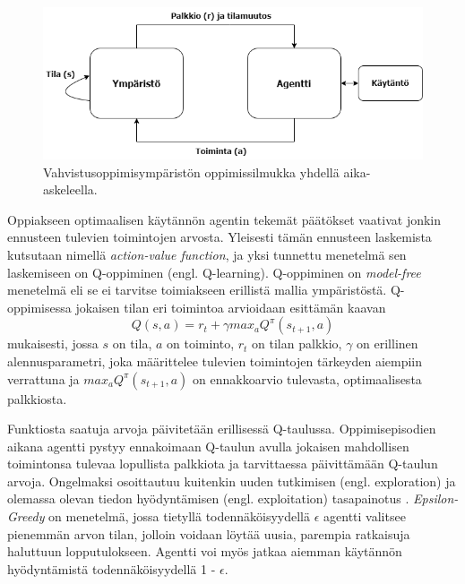 \documentclass[utf8]{gradu3}
\begin{document}
\begin{figure}[h]
\centering
\includegraphics[width=12cm]{reinflearning.png}
\caption{Vahvistusoppimisympäristön oppimissilmukka yhdellä aika-askeleella.}
\label{reinflearning}
\end{figure}

Oppiakseen optimaalisen käytännön agentin tekemät päätökset vaativat jonkin ennusteen tulevien toimintojen arvosta. Yleisesti tämän ennusteen laskemista kutsutaan nimellä \textit{action-value function}, ja yksi tunnettu menetelmä sen laskemiseen on Q-oppiminen (engl. Q-learning). Q-oppiminen on \textit{model-free} menetelmä eli se ei tarvitse toimiakseen erillistä mallia ympäristöstä. Q-oppimisessa jokaisen tilan eri toimintoa arvioidaan \textcite{arulkumaran2017brief} esittämän kaavan \[Q(s,a) = r_t + \gamma max_a Q^\pi (s_{t+1},a)\] mukaisesti, jossa \(s\) on tila, \(a\) on toiminto, \(r_t\) on tilan palkkio, $\gamma$ on erillinen alennusparametri, joka määrittelee tulevien toimintojen tärkeyden aiempiin verrattuna ja \(max_a Q^\pi (s_{t+1},a)\) on ennakkoarvio tulevasta, optimaalisesta palkkiosta.

Funktiosta saatuja arvoja päivitetään erillisessä Q-taulussa. Oppimisepisodien aikana agentti pystyy ennakoimaan Q-taulun avulla jokaisen mahdollisen toimintonsa tulevaa lopullista palkkiota ja tarvittaessa päivittämään Q-taulun arvoja. Ongelmaksi osoittautuu kuitenkin uuden tutkimisen (engl. exploration) ja olemassa olevan tiedon hyödyntämisen (engl. exploitation) tasapainotus \parencite{arulkumaran2017brief}. \textit{Epsilon-Greedy} on menetelmä, jossa tietyllä todennäköisyydellä $\epsilon$ agentti valitsee pienemmän arvon tilan, jolloin voidaan löytää uusia, parempia ratkaisuja haluttuun lopputulokseen. Agentti voi myös jatkaa aiemman käytännön hyödyntämistä todennäköisyydellä 1 - $\epsilon$.
\end{document}
